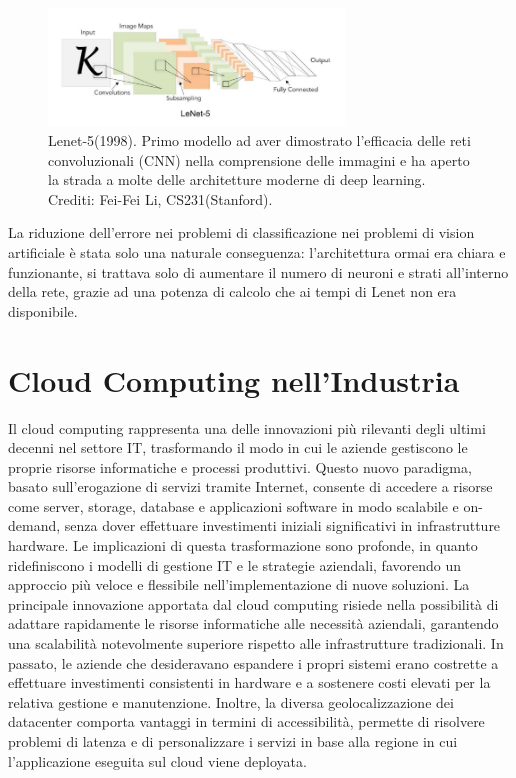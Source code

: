 \begin{figure}[htbp]
    \centering
    \includegraphics[width=0.7\textwidth]{figures/Lenet.png}
    \caption{Lenet-5(1998). Primo modello ad aver dimostrato l'efficacia delle reti convoluzionali (CNN) nella comprensione delle immagini e ha aperto la strada a molte delle architetture moderne di deep learning. Crediti: Fei-Fei Li, CS231(Stanford).}
    \label{fig:Lenet-5}
\end{figure}

\noindent La riduzione dell'errore nei problemi di classificazione nei problemi di vision artificiale è stata solo una naturale conseguenza: l'architettura ormai era chiara e funzionante, si trattava solo di aumentare il numero di neuroni e strati all'interno della rete, grazie ad una potenza di calcolo che ai tempi di Lenet non era disponibile.  
   

\section{Cloud Computing nell'Industria}

Il cloud computing rappresenta una delle innovazioni più rilevanti degli ultimi decenni nel settore IT, trasformando il modo in cui le aziende gestiscono le proprie risorse informatiche e processi produttivi. Questo nuovo paradigma, basato sull’erogazione di servizi tramite Internet, consente di accedere a risorse come server, storage, database e applicazioni software in modo scalabile e on-demand, senza dover effettuare investimenti iniziali significativi in infrastrutture hardware. Le implicazioni di questa trasformazione sono profonde, in quanto ridefiniscono i modelli di gestione IT e le strategie aziendali, favorendo un approccio più veloce e flessibile nell’implementazione di nuove soluzioni. La principale innovazione apportata dal cloud computing risiede nella possibilità di adattare rapidamente le risorse informatiche alle necessità aziendali, garantendo una scalabilità notevolmente superiore rispetto alle infrastrutture tradizionali. In passato, le aziende che desideravano espandere i propri sistemi erano costrette a effettuare investimenti consistenti in hardware e a sostenere costi elevati per la relativa gestione e manutenzione. Inoltre, la diversa geolocalizzazione dei datacenter comporta vantaggi in termini di accessibilità, permette di risolvere problemi di latenza e di personalizzare i servizi in base alla regione in cui l'applicazione eseguita sul cloud viene deployata. 


